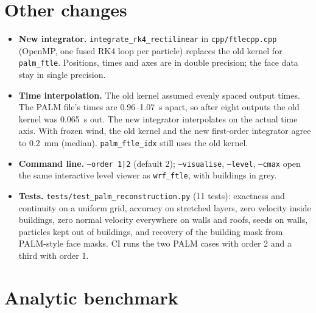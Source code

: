 \documentclass[11pt,a4paper]{article}
\begin{document}
\section{Other changes}

\begin{itemize}
  \item \textbf{New integrator.} \texttt{integrate\_rk4\_rectilinear} in
        \texttt{cpp/ftlecpp.cpp} (OpenMP, one fused RK4 loop per particle)
        replaces the old kernel for \texttt{palm\_ftle}. Positions, times
        and axes are in double precision; the face data stay in single
        precision.
  \item \textbf{Time interpolation.} The old kernel assumed evenly spaced output
        times. The PALM file's times are 0.96--\SI{1.07}{s} apart, so after eight
        outputs the old kernel was \SI{0.065}{s} out. The new integrator
        interpolates on the actual time axis. With frozen wind, the old kernel
        and the new first-order integrator agree to \SI{0.2}{mm} (median).
        \texttt{palm\_ftle\_idx} still uses the old kernel.
  \item \textbf{Command line.} \texttt{--order 1|2} (default 2);
        \texttt{--visualise}, \texttt{--level}, \texttt{--cmax} open the same
        interactive level viewer as \texttt{wrf\_ftle}, with buildings in grey.
  \item \textbf{Tests.} \texttt{tests/test\_palm\_reconstruction.py} (11 tests):
        exactness and continuity on a uniform grid, accuracy on stretched
        layers, zero velocity inside buildings, zero normal velocity everywhere
        on walls and roofs, seeds on walls, particles kept out of buildings,
        and recovery of the building mask from PALM-style face masks. CI
        runs the two PALM cases with order 2 and a third with order 1.
\end{itemize}

\section{Analytic benchmark}
\end{document}
